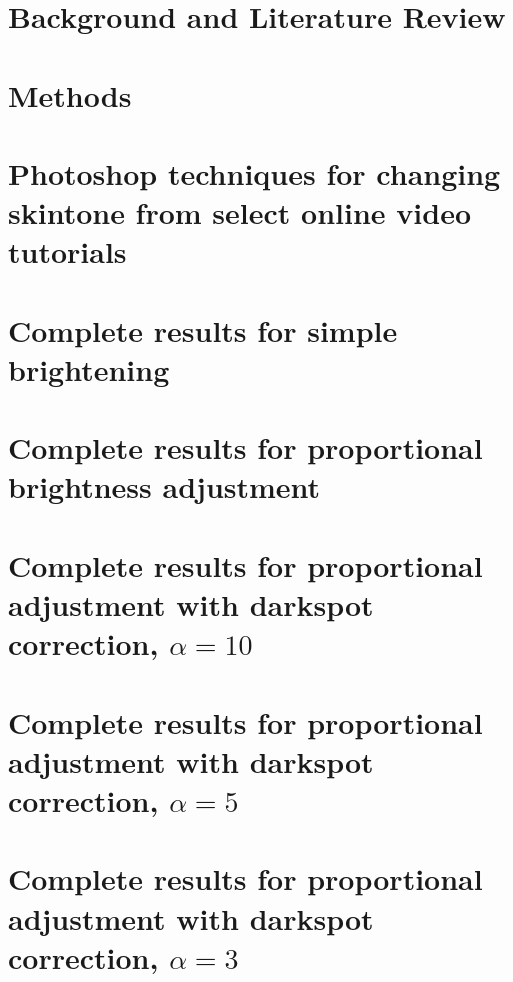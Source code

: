 \documentclass[12pt, a4paper]{article}
\begin{document}
\tableofcontents
\pagebreak

\listoffigures
\listoftables
\pagebreak

\renewcommand{\nomname}{List of Symbols}
\printnomenclature
\pagebreak

\section{Background and Literature Review}

\pagebreak

\section{Methods}

\pagebreak



\pagebreak

\appendix

\section{Photoshop techniques for changing skintone from select online video tutorials}\label{app:photoshop}

\pagebreak

\section{Complete results for simple brightening}\label{app:boost}

\pagebreak

\section{Complete results for proportional brightness adjustment}\label{app:prop}

\pagebreak

\section{Complete results for proportional adjustment with darkspot correction, $\alpha = 10$}\label{app:prop_corr_a10}

\pagebreak

\section{Complete results for proportional adjustment with darkspot correction, $\alpha = 5$}\label{app:prop_corr_a5}

\pagebreak

\section{Complete results for proportional adjustment with darkspot correction, $\alpha = 3$}\label{app:prop_corr_a3}

\end{document}
